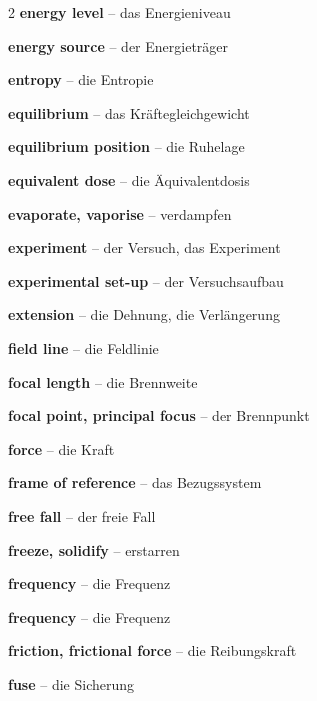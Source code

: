 \begin{multicols}{2}
\textbf{energy level} -- das Energieniveau\dotfill\hyperref[e:294]{\pageref*{e:294}}\par
\textbf{energy source} -- der Energieträger\dotfill\hyperref[e:109]{\pageref*{e:109}}\par
\textbf{entropy} -- die Entropie\dotfill\hyperref[e:142]{\pageref*{e:142}}\par
\textbf{equilibrium} -- das Kräftegleichgewicht\dotfill\hyperref[e:75]{\pageref*{e:75}}\par
\textbf{equilibrium position} -- die Ruhelage\dotfill\hyperref[e:193]{\pageref*{e:193}}\par
\textbf{equivalent dose} -- die Äquivalentdosis\dotfill\hyperref[e:284]{\pageref*{e:284}}\par
\textbf{evaporate, vaporise} -- verdampfen\dotfill\hyperref[e:131]{\pageref*{e:131}}\par
\textbf{experiment} -- der Versuch, das Experiment\dotfill\hyperref[e:16]{\pageref*{e:16}}\par
\textbf{experimental set-up} -- der Versuchsaufbau\dotfill\hyperref[e:17]{\pageref*{e:17}}\par
\textbf{extension} -- die Dehnung, die Verlängerung\dotfill\hyperref[e:71]{\pageref*{e:71}}\par

\par\nopagebreak
\textbf{field line} -- die Feldlinie\dotfill\hyperref[e:173]{\pageref*{e:173}}\par
\textbf{focal length} -- die Brennweite\dotfill\hyperref[e:245]{\pageref*{e:245}}\par
\textbf{focal point, principal focus} -- der Brennpunkt\dotfill\hyperref[e:244]{\pageref*{e:244}}\par
\textbf{force} -- die Kraft\dotfill\hyperref[e:59]{\pageref*{e:59}}\par
\textbf{frame of reference} -- das Bezugssystem\dotfill\hyperref[e:32]{\pageref*{e:32}}\par
\textbf{free fall} -- der freie Fall\dotfill\hyperref[e:46]{\pageref*{e:46}}\par
\textbf{freeze, solidify} -- erstarren\dotfill\hyperref[e:130]{\pageref*{e:130}}\par
\textbf{frequency} -- die Frequenz\dotfill\hyperref[e:52]{\pageref*{e:52}}\par
\textbf{frequency} -- die Frequenz\dotfill\hyperref[e:197]{\pageref*{e:197}}\par
\textbf{friction, frictional force} -- die Reibungskraft\dotfill\hyperref[e:65]{\pageref*{e:65}}\par
\textbf{fuse} -- die Sicherung\dotfill\hyperref[e:165]{\pageref*{e:165}}\par


\end{multicols}
